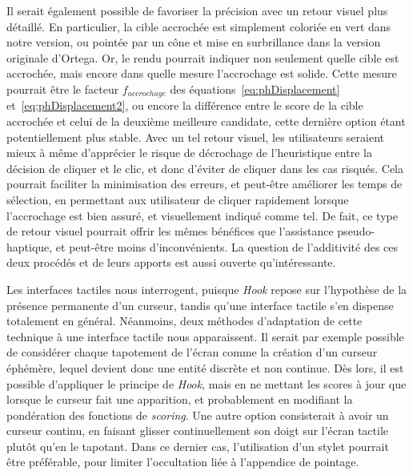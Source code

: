	Il serait également possible de favoriser la précision avec un retour visuel plus détaillé. En particulier, la cible accrochée est simplement coloriée en vert dans notre version, ou pointée par un cône et mise en surbrillance dans la version originale d'Ortega. Or, le rendu pourrait indiquer non seulement quelle cible est accrochée, mais encore dans quelle mesure l'accrochage est solide. Cette mesure pourrait être le facteur $f_{accrochage}$ des équations~\ref{eq:phDisplacement} et~\ref{eq:phDisplacement2}, ou encore la différence entre le score de la cible accrochée et celui de la deuxième meilleure candidate, cette dernière option étant potentiellement plus stable. Avec un tel retour visuel, les utilisateurs seraient mieux à même d'apprécier le risque de décrochage de l'heuristique entre la décision de cliquer et le clic, et donc d'éviter de cliquer dans les cas risqués. Cela pourrait faciliter la minimisation des erreurs, et peut-être améliorer les temps de sélection, en permettant aux utilisateur de cliquer rapidement lorsque l'accrochage est bien assuré, et visuellement indiqué comme tel. De fait, ce type de retour visuel pourrait offrir les mêmes bénéfices que l'assistance pseudo-haptique, et peut-être moins d'inconvénients. La question de l'additivité des ces deux procédés et de leurs apports est aussi ouverte qu'intéressante.
	
	Les interfaces tactiles nous interrogent, puisque \emph{Hook} repose sur l'hypothèse de la présence permanente d'un curseur, tandis qu'une interface tactile s'en dispense totalement en général. Néanmoins, deux méthodes d'adaptation de cette technique à une interface tactile nous apparaissent. Il serait par exemple possible de considérer chaque tapotement de l'écran comme la création d'un curseur éphémère, lequel devient donc une entité discrète et non continue. Dès lors, il est possible d'appliquer le principe de \emph{Hook}, mais en ne mettant les scores à jour que lorsque le curseur fait une apparition, et probablement en modifiant la pondération des fonctions de \emph{scoring}. Une autre option consisterait à avoir un curseur continu, en faisant glisser continuellement son doigt sur l'écran tactile plutôt qu'en le tapotant. Dans ce dernier cas, l'utilisation d'un stylet pourrait être préférable, pour limiter l'occultation liée à l'appendice de pointage.
	
